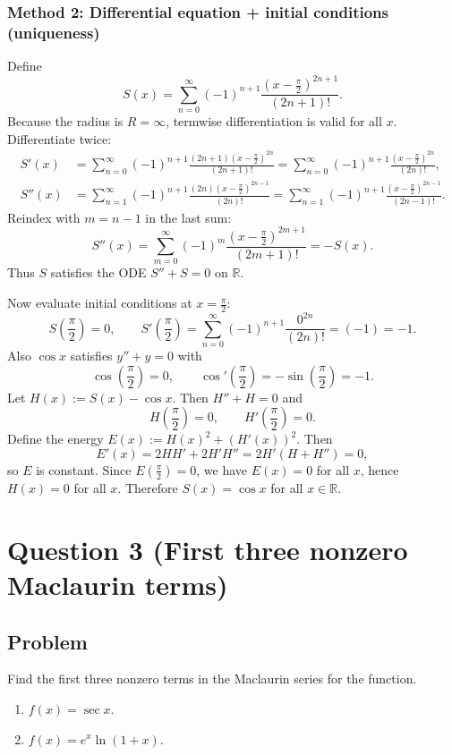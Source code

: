 \documentclass[12pt]{article}
\newcommand{\R}{\mathbb{R}}
\begin{document}
\subsubsection*{Method 2: Differential equation + initial conditions (uniqueness)}
Define
\[
S(x)=\sum_{n=0}^{\infty}(-1)^{n+1}\frac{\left(x-\frac{\pi}{2}\right)^{2n+1}}{(2n+1)!}.
\]
Because the radius is \(R=\infty\), termwise differentiation is valid for all \(x\). Differentiate twice:
\begin{align*}
S'(x)
&=\sum_{n=0}^{\infty}(-1)^{n+1}\frac{(2n+1)\left(x-\frac{\pi}{2}\right)^{2n}}{(2n+1)!}
=\sum_{n=0}^{\infty}(-1)^{n+1}\frac{\left(x-\frac{\pi}{2}\right)^{2n}}{(2n)!},\\
S''(x)
&=\sum_{n=1}^{\infty}(-1)^{n+1}\frac{(2n)\left(x-\frac{\pi}{2}\right)^{2n-1}}{(2n)!}
=\sum_{n=1}^{\infty}(-1)^{n+1}\frac{\left(x-\frac{\pi}{2}\right)^{2n-1}}{(2n-1)!}.
\end{align*}
Reindex with \(m=n-1\) in the last sum:
\[
S''(x)=\sum_{m=0}^{\infty}(-1)^{m}\frac{\left(x-\frac{\pi}{2}\right)^{2m+1}}{(2m+1)!}
=-S(x).
\]
Thus \(S\) satisfies the ODE \(S''+S=0\) on \(\R\).

Now evaluate initial conditions at \(x=\frac{\pi}{2}\):
\[
S\!\left(\frac{\pi}{2}\right)=0,\qquad
S'\!\left(\frac{\pi}{2}\right)=\sum_{n=0}^{\infty}(-1)^{n+1}\frac{0^{2n}}{(2n)!}=(-1)=-1.
\]
Also \(\cos x\) satisfies \(y''+y=0\) with
\[
\cos\!\left(\frac{\pi}{2}\right)=0,\qquad \cos'\!\left(\frac{\pi}{2}\right)=-\sin\!\left(\frac{\pi}{2}\right)=-1.
\]
Let \(H(x):=S(x)-\cos x\). Then \(H''+H=0\) and
\[
H\!\left(\frac{\pi}{2}\right)=0,\qquad H'\!\left(\frac{\pi}{2}\right)=0.
\]
Define the energy \(E(x):=H(x)^2+(H'(x))^2\). Then
\[
E'(x)=2H H'+2H'H''=2H'(H+H'')=0,
\]
so \(E\) is constant. Since \(E(\frac{\pi}{2})=0\), we have \(E(x)=0\) for all \(x\), hence \(H(x)=0\) for all \(x\).
Therefore \(S(x)=\cos x\) for all \(x\in\R\).

\newpage
\section*{Question 3 (First three nonzero Maclaurin terms)}
\subsection*{Problem}
Find the first three nonzero terms in the Maclaurin series for the function.
\begin{enumerate}[label=(\alph*)]
  \item \(f(x)=\sec x.\)
  \item \(f(x)=e^x\ln(1+x).\)
\end{enumerate}
\end{document}
